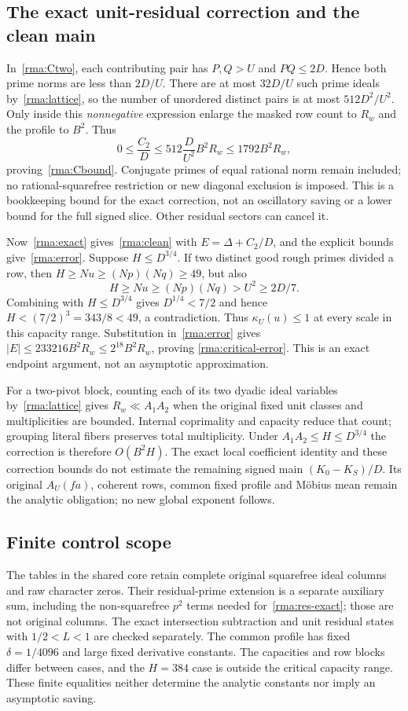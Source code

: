 \documentclass[11pt]{article}
\theoremstyle{definition}\newtheorem{definition}[theorem]{Definition}
\theoremstyle{remark}\newtheorem{remark}[theorem]{Remark}
\begin{document}
\subsection{The exact unit-residual correction and the clean main}
In~\eqref{rma:Ctwo}, each contributing pair has $P,Q>U$ and $PQ\le2D$.
Hence both prime norms are less than $2D/U$. There are at most
$32D/U$ such prime ideals by~\eqref{rma:lattice}, so the number of
unordered distinct pairs is at most $512D^2/U^2$. Only inside this
\emph{nonnegative} expression enlarge the masked row count to $R_w$
and the profile to $B^2$. Thus
\[
 0\le\frac{C_2}{D}\le512\frac{D}{U^2}B^2R_w
                         \le1792B^2R_w,
\]
proving~\eqref{rma:Cbound}. Conjugate primes of equal rational norm
remain included; no rational-squarefree restriction or new diagonal
exclusion is imposed. This is a bookkeeping bound for the exact
correction, not an oscillatory saving or a lower bound for the full
signed slice. Other residual sectors can cancel it.

Now~\eqref{rma:exact} gives~\eqref{rma:clean} with
$E=\Delta+C_2/D$, and the explicit bounds give~\eqref{rma:error}.
Suppose $H\le D^{3/4}$. If two distinct good rough primes divided a row,
then $H\ge Nu\ge(Np)(Nq)\ge49$, but also
\[
 H\ge Nu\ge(Np)(Nq)>U^2\ge2D/7.
\]
Combining with $H\le D^{3/4}$ gives $D^{1/4}<7/2$ and hence
$H<(7/2)^3=343/8<49$, a contradiction. Thus $\kappa_U(u)\le1$
at every scale in this capacity range. Substitution in~\eqref{rma:error}
gives $|E|\le233216B^2R_w\le2^{18}B^2R_w$, proving
\eqref{rma:critical-error}. This is an exact endpoint argument, not an
asymptotic approximation.

For a two-pivot block, counting each of its two dyadic ideal variables
by~\eqref{rma:lattice} gives $R_w\ll A_1A_2$ when the original fixed unit
classes and multiplicities are bounded. Internal coprimality and capacity
reduce that count; grouping literal fibers preserves total multiplicity.
Under $A_1A_2\le H\le D^{3/4}$ the correction is therefore $O(B^2H)$.
The exact local coefficient identity and these correction bounds do not
estimate the remaining signed main $(K_0-K_S)/D$. Its original
$A_U(fa)$, coherent rows, common fixed profile and M\"obius mean remain
the analytic obligation; no new global exponent follows.


\subsection{Finite control scope}
The tables in the shared core retain complete original squarefree ideal
columns and raw character zeros. Their residual-prime extension is a
separate auxiliary sum, including the non-squarefree $p^2$ terms needed
for~\eqref{rma:res-exact}; those are not original columns. The exact
intersection subtraction and unit residual states with $1/2<L<1$ are
checked separately. The common profile has fixed $\delta=1/4096$ and
large fixed derivative constants. The capacities and row blocks differ
between cases, and the $H=384$ case is outside the critical capacity
range. These finite equalities neither determine the analytic constants
nor imply an asymptotic saving.
\end{document}

